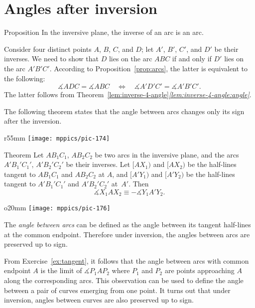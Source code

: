 \section*{Angles after inversion}

\begin{thm}{Proposition}
In the inversive plane, the inverse of an arc is an arc.

\end{thm}

Consider four distinct points $A$, $B$, $C$, and $D$; 
let $A'$, $B'$, $C'$, and $D'$  be their inverses.
We need to show that $D$ lies on the arc $ABC$ if and only if $D'$ lies on the arc $A'B'C'$.
According to Proposition~\ref{prop:arcs},
the latter is equivalent to the following:
$$\measuredangle ADC= \measuredangle ABC
\quad
\iff
\quad  
\measuredangle A'D'C'= \measuredangle A'B'C'.$$
The latter follows from Theorem~\ref{lem:inverse-4-angle}\textit{\ref{lem:inverse-4-angle:angle}}.
\qeds

The following theorem states that the angle between arcs changes only its sign after the inversion.

{

\begin{wrapfigure}{r}{55mm}
\vskip-6mm
\centering
\texttt{[image: mppics/pic-174]}
\end{wrapfigure}

\begin{thm}{Theorem}\label{thm:angle-inversion}
Let $AB_1C_1$, $AB_2C_2$ be two arcs in the inversive plane,
and the arcs $A'B_1'C_1'$, $A'B_2'C_2'$ be their inverses.
Let $[AX_1)$ and $[AX_2)$ be the half-lines tangent to $AB_1C_1$ and  $AB_2C_2$ at $A$,
and
$[A'Y_1)$ and $[A'Y_2)$ be the half-lines tangent to $A'B_1'C_1'$ and  $A'B_2'C_2'$ at~$A'$.
Then
$$\measuredangle X_1AX_2\equiv-\measuredangle Y_1A'Y_2.$$

\end{thm}

}

{

\begin{wrapfigure}[6]{o}{20mm}
\vskip-6mm
\centering
\texttt{[image: mppics/pic-176]}
\end{wrapfigure}

The \emph{angle between arcs} can be defined as the angle between its tangent half-lines at the common endpoint.
Therefore under inversion, the angles between arcs are preserved up to sign.


From Exercise~\ref{ex:tangent}, it follows that the angle between arcs with common endpoint $A$ is the limit of $\measuredangle P_1AP_2$ where $P_1$ and $P_2$ are points approaching $A$ along the corresponding arcs. 
This observation can be used to define the angle between a pair of curves emerging from one point.
It turns out that under inversion, angles between curves are also preserved up to sign.

}


